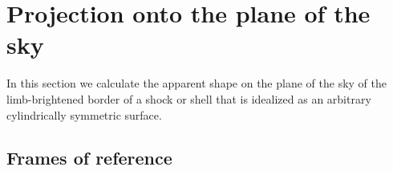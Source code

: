 \newenvironment{Vector}{\left(\begin{array}{c}}{\end{array}\right)}
\newcommand\uvec[1]{\bm{\hat{#1}}}
\newcommand\T{_{\mathrm{\scriptscriptstyle T}}}

\section{Projection onto the plane of the sky}
\label{sec:projection}

In this section we calculate the apparent shape on the plane of the
sky of the limb-brightened border of a shock or shell that is
idealized as an arbitrary cylindrically symmetric surface.


\subsection{Frames of reference}
\label{sec:ref-frames}

